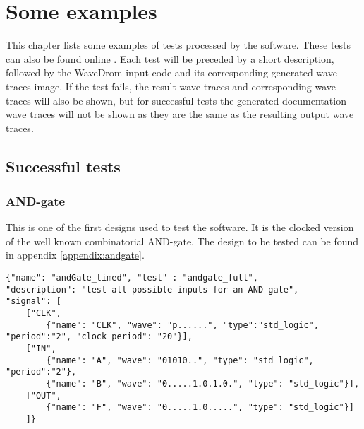 \section{Some examples}\label{some_examples}
This chapter lists some examples of tests processed by the software. These tests can also be found online \cite{examples}.  Each test will be preceded by a short description, followed by the WaveDrom input code and its corresponding generated wave traces image. If the test fails, the result wave traces and corresponding wave traces will also be shown, but for successful tests the generated documentation wave traces will not be shown as they are the same as the resulting output wave traces.\newpage
\subsection{Successful tests}
\subsubsection{AND-gate}
This is one of the first designs used to test the software. It is the clocked version of the well known combinatorial AND-gate. The  design to be tested can be found in appendix \ref{appendix:andgate}.
\begin{lstlisting}[style=json, caption={Full functionality test for the timed AND-gate design in appendix \ref{appendix:andgate}}, label={json:andgatefull_result}]
{"name": "andGate_timed", "test" : "andgate_full", 
"description": "test all possible inputs for an AND-gate", 
"signal": [
	["CLK",
		{"name": "CLK", "wave": "p......", "type":"std_logic", "period":"2", "clock_period": "20"}],
	["IN",
		{"name": "A", "wave": "01010..", "type": "std_logic", "period":"2"},
		{"name": "B", "wave": "0.....1.0.1.0.", "type": "std_logic"}],
	["OUT",
		{"name": "F", "wave": "0.....1.0.....", "type": "std_logic"}]
	]}
\end{lstlisting}
